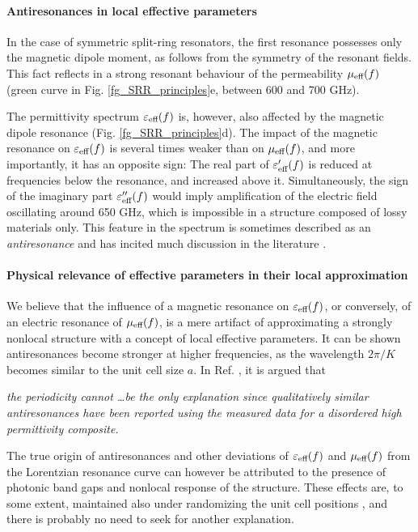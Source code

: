 \paragraph{Antiresonances in local effective parameters}%
In the case of symmetric split-ring resonators, the first resonance possesses only the magnetic dipole moment, as follows from the symmetry of the resonant fields. This fact reflects in a strong resonant behaviour of the permeability $\mu_{\text{eff} }(f)$ (green curve in Fig. \ref{fg_SRR_principles}e, between 600 and 700 GHz). 

The permittivity spectrum $\varepsilon_{\text{eff} }(f)$ is, however, also affected by the magnetic dipole resonance  (Fig. \ref{fg_SRR_principles}d). The impact of the magnetic resonance on $\varepsilon_{\text{eff} }(f)$ is several times weaker than on $\mu_{\text{eff} }(f)$, and more importantly, it has an opposite sign: The real part of $\varepsilon_{\text{eff} }'(f)$ is reduced at frequencies below the resonance, and increased above it. Simultaneously, the sign of the imaginary part $\varepsilon_{\text{eff} }''(f)$ would imply amplification of the electric field oscillating around 650 GHz, which is impossible in a structure composed of lossy materials only. This feature in the spectrum is sometimes described as an \textit{antiresonance} and has incited much discussion in the literature \cite{koschny2003resonant, wallen2011anti}. 
\paragraph{Physical relevance of effective parameters in their local approximation}%
We believe that the influence of a magnetic resonance on $\varepsilon_{\text{eff} }(f)$, or conversely, of an electric resonance of $\mu_{\text{eff} }(f)$, is a mere artifact of approximating a strongly nonlocal structure with a concept of local effective parameters. It can be shown antiresonances become stronger at higher frequencies, as the wavelength $2\pi/K$ becomes similar to the unit cell size $a$. 
In Ref. \cite{wallen2011anti}, it is argued that %
\begin{displayquote}
\textit{the periodicity cannot \ldots be the only explanation since qualitatively similar antiresonances have been reported using the measured data for a disordered high permittivity composite.}
\end{displayquote}
The true origin of antiresonances and other deviations of $\varepsilon_{\text{eff} }(f)$ and $\mu_{\text{eff} }(f)$ from the Lorentzian resonance curve can however be attributed to the presence of photonic band gaps and nonlocal response of the structure. These effects are, to some extent, maintained also under randomizing the unit cell positions \cite{peng2007},   
and there is probably no need to seek for another explanation. %

